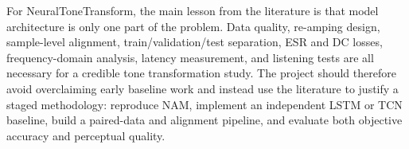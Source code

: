 \documentclass[conference]{IEEEtran}
\begin{document}
For NeuralToneTransform, the main lesson from the literature is that model architecture is only one part of the problem. Data quality, re-amping design, sample-level alignment, train/validation/test separation, ESR and DC losses, frequency-domain analysis, latency measurement, and listening tests are all necessary for a credible tone transformation study. The project should therefore avoid overclaiming early baseline work and instead use the literature to justify a staged methodology: reproduce NAM, implement an independent LSTM or TCN baseline, build a paired-data and alignment pipeline, and evaluate both objective accuracy and perceptual quality.

\clearpage
\noindent\makebox[0pt][l]{%
\hspace*{-\dimexpr\columnwidth+\columnsep\relax}%
\begin{minipage}[t]{\columnwidth}


\end{minipage}%
}
\end{document}
